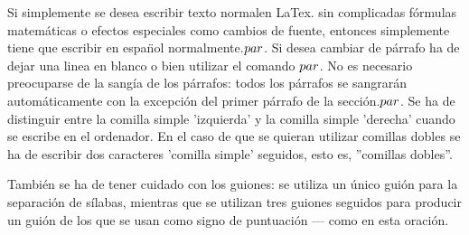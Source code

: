\documentclass[a4paper,10pt]{letter}
\begin{document}
Si simplemente se desea escribir texto normalen LaTex.
sin complicadas f\'ormulas matem\'aticas o efectos especiales
como cambios de fuente, entonces simplemente tiene que escribir
en espa\"nol normalmente.$\\par$.
Si desea cambiar de párrafo ha de dejar una linea en blanco o bien
utilizar el comando $\\par$.
No es necesario preocuparse de la sangía de los párrafos:
todos los párrafos se sangrarán automáticamente con la excepción 
del primer párrafo de la sección.$\\par$.
Se ha de distinguir entre la comilla simple 'izquierda'
y la comilla simple 'derecha' cuando se escribe en el ordenador.
En el caso de que se quieran utilizar comillas dobles se ha de
escribir dos caracteres 'comilla simple' seguidos, esto es,
''comillas dobles''.

También se ha de tener cuidado con los guiones: se utiliza un único
guión para la separación de sílabas, mientras que se utilizan
tres guiones seguidos para producir un guión de los que se usan
como signo de puntuación --- como en esta oración.
\end{document}
